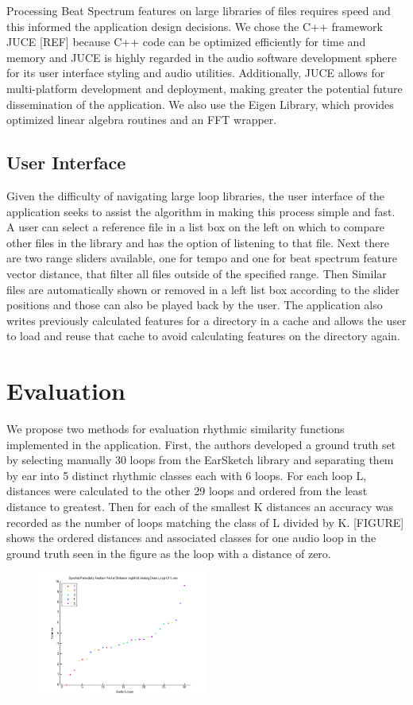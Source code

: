 \documentclass{article}
\begin{document}
Processing Beat Spectrum features on large libraries of files requires speed and this informed the application design decisions. We chose the C++ framework JUCE [REF] because C++ code can be optimized efficiently for time and memory and JUCE is highly regarded in the audio software development sphere for its user interface styling and audio utilities. Additionally, JUCE allows for multi-platform development and deployment, making greater the potential future dissemination of the application. We also use the Eigen Library, which provides optimized linear algebra routines and an FFT wrapper.

\subsection{User Interface}
Given the difficulty of navigating large loop libraries, the user interface of the application seeks to assist the algorithm in making this process simple and fast. A user can select a reference file in a list box on the left on which to compare other files in the library and has the option of listening to that file. Next there are two range sliders available, one for tempo and one for beat spectrum feature vector distance, that filter all files outside of the specified range. Then Similar files are automatically shown or removed in a left list box according to the slider positions and those can also be played back by the user. The application also writes previously calculated features for a directory in a cache and allows the user to load and reuse that cache to avoid calculating features on the directory again.


\section{Evaluation}
We propose two methods for evaluation rhythmic similarity functions implemented in the application. First, the authors developed a ground truth set by selecting manually 30 loops from the EarSketch library and separating them by ear into 5 distinct rhythmic classes each with 6 loops. For each loop L, distances were calculated to the other 29 loops and ordered from the least distance to greatest. Then for each of the smallest K distances an accuracy was recorded as the number of loops matching the class of L divided by K. [FIGURE] shows the ordered distances and associated classes for one audio loop in the ground truth seen in the figure as the loop with a distance of zero.

\begin{figure}[h!]
  \centering
    \includegraphics[width=0.5\textwidth]{distance_graph_eval1.png}
      \caption{}
\end{figure}
\end{document}
